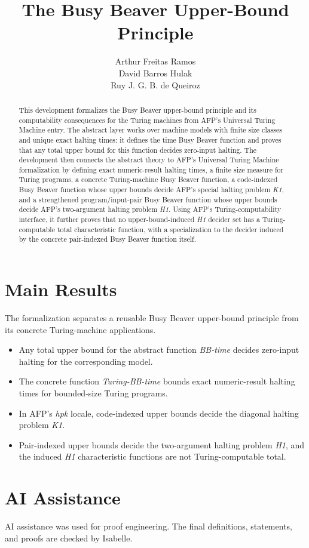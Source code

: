 \documentclass[11pt,a4paper]{article}
\begin{document}
\title{The Busy Beaver Upper-Bound Principle}
\author{Arthur Freitas Ramos\\
David Barros Hulak\\
Ruy J. G. B. de Queiroz}
\maketitle

\begin{abstract}
This development formalizes the Busy Beaver upper-bound principle and its
computability consequences for the Turing machines from AFP's Universal Turing
Machine entry.  The abstract layer works over machine models with finite size
classes and unique exact halting times: it defines the time Busy Beaver function
and proves that any total upper bound for this function decides zero-input
halting.  The development then connects the abstract theory to AFP's Universal
Turing Machine formalization by defining exact numeric-result halting times, a
finite size measure for Turing programs, a concrete Turing-machine Busy Beaver
function, a code-indexed Busy Beaver function whose upper bounds decide AFP's
special halting problem \emph{K1}, and a strengthened program/input-pair Busy
Beaver function whose upper bounds decide AFP's two-argument halting problem
\emph{H1}.  Using AFP's Turing-computability interface, it further proves that
no upper-bound-induced \emph{H1} decider set has a Turing-computable total
characteristic function, with a specialization to the decider induced by the
concrete pair-indexed Busy Beaver function itself.
\end{abstract}

\tableofcontents

\section*{Main Results}

The formalization separates a reusable Busy Beaver upper-bound principle from
its concrete Turing-machine applications.

\begin{itemize}
\item Any total upper bound for the abstract function \emph{BB-time} decides
  zero-input halting for the corresponding model.
\item The concrete function \emph{Turing-BB-time} bounds exact numeric-result
  halting times for bounded-size Turing programs.
\item In AFP's \emph{hpk} locale, code-indexed upper bounds decide the diagonal
  halting problem \emph{K1}.
\item Pair-indexed upper bounds decide the two-argument halting problem
  \emph{H1}, and the induced \emph{H1} characteristic functions are not
  Turing-computable total.
\end{itemize}



\section*{AI Assistance}

AI assistance was used for proof engineering. The final definitions,
statements, and proofs are checked by Isabelle.



\end{document}
